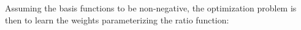 \message{ !name(formulation.tex)}\documentclass[8pt]{article}
\begin{document}
  Assuming the basis functions to be
non-negative, the optimization problem is then to learn the weights
parameterizing the ratio function:

\end{document}
